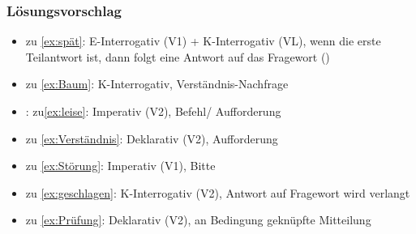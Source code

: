 
\begin{frame}
\frametitle{Lösungsvorschlag}

\begin{itemize}
\item zu \ref{ex:spät}: E-Interrogativ (V1) + K-Interrogativ (VL), wenn die erste Teilantwort  ist, dann folgt eine Antwort auf das Fragewort ()
\item zu \ref{ex:Baum}: K-Interrogativ, Verständnis-Nachfrage
\item: zu\ref{ex:leise}: Imperativ (V2), Befehl/ Aufforderung
\item zu \ref{ex:Verständnis}: Deklarativ (V2), Aufforderung
\item zu \ref{ex:Störung}: Imperativ (V1), Bitte
\item zu \ref{ex:geschlagen}: K-Interrogativ (V2), Antwort auf Fragewort wird verlangt
\item zu \ref{ex:Prüfung}: Deklarativ (V2), an Bedingung geknüpfte Mitteilung
\end{itemize}

\end{frame}

